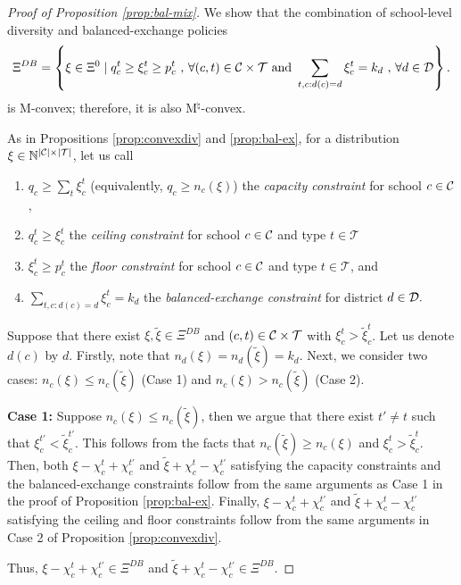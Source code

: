 \documentclass[12pt]{amsart}
\theoremstyle{remark}
\def\T{\mathcal{T}} \def\calt{\mathcal{T}}
\begin{document}
\begin{proof}[Proof of Proposition \ref{prop:bal-mix}]
We show that the combination of school-level diversity and balanced-exchange policies  \[\Xi^{DB} = \left \{\xi\in \Xi^0 \mid q_c^t \geq \xi_c^t \geq p_c^t \text{ , } \forall (c,t)\in \calc \times \calt \text{ and }
  \sum_{t,c:d(c) = d} \xi_c^t = k_{d} \text{ , } \forall d \in \cald\right \}.\] is M-convex; therefore, it is also M$^{\natural}$-convex.

As in Propositions \ref{prop:convexdiv} and \ref{prop:bal-ex}, for a distribution $\xi \in \mathbb N^{|\C|\times |\T|}$, let us call
\begin{enumerate}
\item $q_c \geq \sum_t \xi_c^t$ (equivalently, $q_c \geq n_c(\xi)$) the \emph{capacity constraint} for school $c\in \mathcal{C}$,
\item $q_c^t \geq \xi_c^t$ the \emph{ceiling constraint} for school $c\in \mathcal{C}$ and type $t\in \calt$
\item $\xi_c^t \geq p_c^t$ the \emph{floor constraint} for school $c\in \mathcal{C}$ and type $t\in \calt$, and
\item $\sum_{t,c:d(c)=d} \xi_c^t = k_{d}$  the \emph{balanced-exchange constraint} for district $d \in \mathcal{D}.$

\end{enumerate}

Suppose that there exist $\xi,\tilde{\xi}\in \Xi^{DB}$ and $(c,t) \in \calc \times \calt$ with $\xi_c^t>\tilde{\xi}_{c}^{t}$. Let us denote $d(c)$ by $d$. Firstly, note that $n_d(\xi) = n_d(\tilde \xi) = k_{d}$. Next, we consider two cases: $n_c(\xi) \leq n_c(\tilde \xi)$ (Case 1) and $n_c(\xi) > n_c(\tilde \xi)$ (Case 2).

\textbf{Case 1:} Suppose $n_c(\xi) \leq n_c(\tilde \xi)$, then we argue that there exist $t' \neq t$ such that $\xi_c^{t'} < \tilde{\xi}_{c}^{t'}$. This follows from the facts that $n_c(\tilde \xi) \geq n_c(\xi)$ and $\xi_c^t>\tilde{\xi}_{c}^{t}$. Then, both $\xi-\chi_c^t+\chi_{c}^{t'}$ and $\tilde{\xi}+\chi_c^t-\chi_{c}^{t'}$ satisfying the capacity constraints and the balanced-exchange constraints follow from the same arguments as Case 1 in the proof of Proposition \ref{prop:bal-ex}. Finally, $\xi-\chi_c^t+\chi_{c}^{t'}$ and $\tilde{\xi}+\chi_c^t-\chi_{c}^{t'}$ satisfying the ceiling and floor constraints follow from the same arguments in Case 2 of Proposition \ref{prop:convexdiv}.

Thus, $\xi-\chi_c^t+\chi_{c}^{t'} \in \Xi^{DB}$ and $\tilde{\xi}+\chi_c^t-\chi_{c}^{t'}\in \Xi^{DB}$.


\end{proof}
\end{document}
